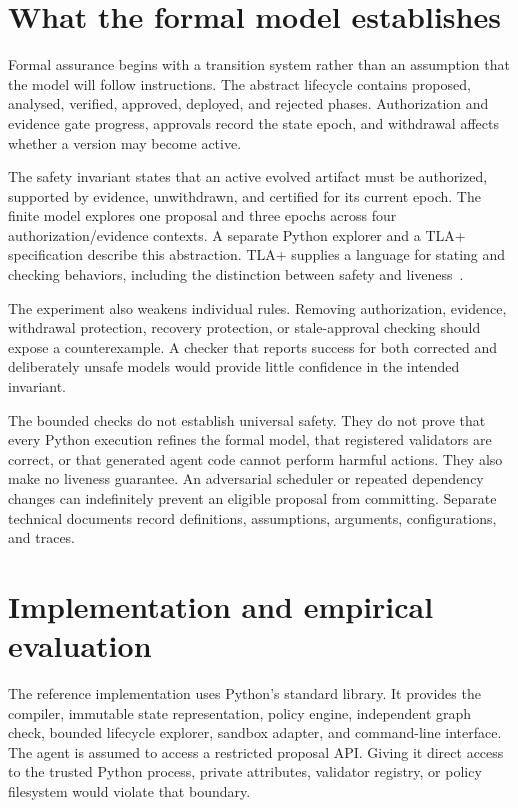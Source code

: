 \IfFileExists{IEEEcsmag.cls}{\publishertrue\documentclass{IEEEcsmag}}{\publisherfalse\documentclass[11pt]{article}}
\begin{document}
\section{What the formal model establishes}
Formal assurance begins with a transition system rather than an assumption that the model will follow instructions. The abstract lifecycle contains proposed, analysed, verified, approved, deployed, and rejected phases. Authorization and evidence gate progress, approvals record the state epoch, and withdrawal affects whether a version may become active.

The safety invariant states that an active evolved artifact must be authorized, supported by evidence, unwithdrawn, and certified for its current epoch. The finite model explores one proposal and three epochs across four authorization/evidence contexts. A separate Python explorer and a TLA+ specification describe this abstraction. TLA+ supplies a language for stating and checking behaviors, including the distinction between safety and liveness~\cite{lamport2002}.

The experiment also weakens individual rules. Removing authorization, evidence, withdrawal protection, recovery protection, or stale-approval checking should expose a counterexample. A checker that reports success for both corrected and deliberately unsafe models would provide little confidence in the intended invariant.

The bounded checks do not establish universal safety. They do not prove that every Python execution refines the formal model, that registered validators are correct, or that generated agent code cannot perform harmful actions. They also make no liveness guarantee. An adversarial scheduler or repeated dependency changes can indefinitely prevent an eligible proposal from committing. Separate technical documents record definitions, assumptions, arguments, configurations, and traces.

\section{Implementation and empirical evaluation}
The reference implementation uses Python's standard library. It provides the compiler, immutable state representation, policy engine, independent graph check, bounded lifecycle explorer, sandbox adapter, and command-line interface. The agent is assumed to access a restricted proposal API. Giving it direct access to the trusted Python process, private attributes, validator registry, or policy filesystem would violate that boundary.
\end{document}
